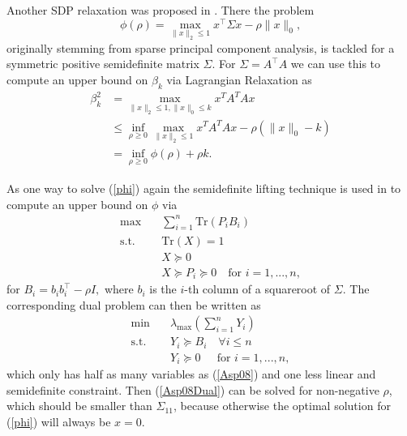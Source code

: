 \documentclass[journal]{IEEEtran}
\newcommand{\Norm}[2]{\lVert{#1}\rVert_{#2}}
\newcommand{\T}{^{\top}}
\newcommand{\Tr}{\text{Tr}}
\begin{document}
Another SDP relaxation was proposed in \cite{Asp08}. There the problem
\begin{equation}\label{phi}
 \phi(\rho) = \max_{\Norm{x}{2} \leq 1} x\T \Sigma x - \rho \Norm{x}{0},
\end{equation}
originally stemming from sparse principal component analysis, is tackled for a symmetric positive semidefinite matrix $\Sigma$. For
$\Sigma = A\T A$ we can use this to compute an upper bound on $\beta_k$ via Lagrangian Relaxation as
\begin{equation*}
 \begin{aligned}
  \beta_k^2 & = \max_{\|x\|_2 \leq 1, \|x\|_0 \leq k} x^TA^TAx \\
	    & \leq \inf_{\rho \geq 0} \max_{\|x\|_2\leq 1} x^TA^TAx - \rho (\|x\|_0-k) \\
	    & = \inf_{\rho \geq 0} \phi(\rho) + \rho k.
 \end{aligned}
\end{equation*}

As one way to solve (\ref{phi}) again the semidefinite lifting technique is used in \cite{Asp08} to compute an upper bound on $\phi$ via
\begin{align}\label{Asp08}
 \max \quad & \sum_{i=1}^n\Tr(P_iB_i) \nonumber \\
 \text{s.t.} \quad & \Tr(X) = 1 \nonumber \\
 & X \succeq 0 \tag{A2-Primal} \\
 & X \succeq P_i \succeq 0 \quad \text{for } i = 1, ..., n, \nonumber
\end{align}
for $B_i = b_ib_i\T - \rho I,$ where $b_i$ is the $i$-th column of a squareroot of $\Sigma$. The corresponding dual problem can then be written as 
\begin{align}\label{Asp08Dual}
  \min \quad & \lambda_{\max}\left(\sum_{i=1}^n Y_i \right) \nonumber \\
  \text{s.t.} \quad & Y_i \succeq B_i \quad \forall i \leq n \tag{A2-Dual} \\
  & Y_i \succeq 0 \quad \ \ \text{for } i = 1, ..., n, \nonumber
\end{align}
which only has half as many variables as (\ref{Asp08}) and one less linear and semidefinite constraint. Then (\ref{Asp08Dual}) can be solved for non-negative $\rho$, which should be smaller than $\Sigma_{11}$, because otherwise the
optimal solution for (\ref{phi}) will always be $x=0$. 
\end{document}
